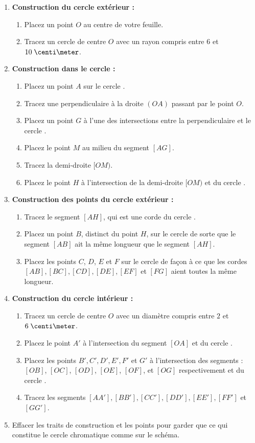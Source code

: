 \begin{enumerate}
    \item \textbf{Construction du cercle extérieur :} 
    \begin{enumerate}
        \item Placez un point $O$ au centre de votre feuille.
        \item Tracez un cercle \Co de centre $O$ avec un rayon compris entre $6$ et $10\;\centi\meter$.
    \end{enumerate}

    \item \textbf{Construction dans le cercle :}
    \begin{enumerate}    
        \item Placez un point $A$ sur le cercle \Co.
        \item Tracez une perpendiculaire à la droite $(OA)$ passant par le point $O$.
        \item Placez un point $G$ à l'une des intersections entre la perpendiculaire et le cercle \Co.
        \item Placez le point $M$ au milieu du segment $[AG]$.
        \item Tracez la demi-droite $[OM)$.
        \item Placez le point $H$ à l'intersection de la demi-droite $[OM)$ et du cercle \Co.
    \end{enumerate}

    \item \textbf{Construction des points du cercle extérieur :}
    \begin{enumerate}
        \item Tracez le segment $[AH]$, qui est une corde du cercle \Co.
        \item Placez un point $B$, distinct du point $H$, sur le cercle \Co de sorte que le segment $[AB]$ ait la même longueur que le segment $[AH]$.
        \item Placez les points $C$, $D$, $E$ et $F$ sur le cercle \Co de façon à ce que les cordes $[AB], [BC], [CD], [DE], [EF]$ et $[FG]$ aient toutes la même longueur.
    \end{enumerate}

    \item \textbf{Construction du cercle intérieur :}
    \begin{enumerate}
        \item Tracez un cercle \Cd de centre $O$ avec un diamètre compris entre $2$ et $6\;\centi\meter$.
        \item Placez le point $A'$ à l'intersection du segment $[OA]$ et du cercle \Cd.
        \item Placez les points $B', C', D', E', F'$ et $G'$ à l'intersection des segments :
        $[OB]$, $[OC]$, $[OD]$, $[OE]$, $[OF]$, et $[OG]$ respectivement et du cercle \Cd.
        \item Tracez les segments $[AA'], [BB'], [CC'], [DD'], [EE'], [FF']$ et $[GG']$.
    \end{enumerate}
    \item Effacer les traits de construction et les points pour garder que ce qui constitue le cercle chromatique comme sur le schéma.
\end{enumerate}

